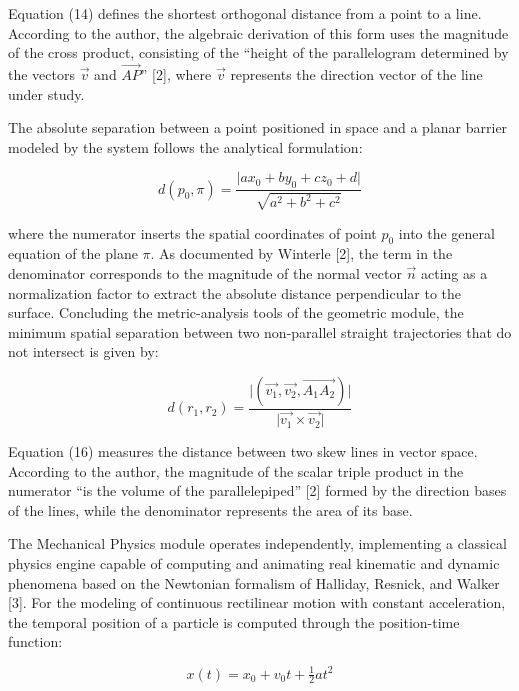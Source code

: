 \documentclass[conference,a4paper]{IEEEtran}
\begin{document}
Equation (14) defines the shortest orthogonal distance from a point to a line. According to the author, the algebraic derivation of this form uses the magnitude of the cross product, consisting of the ``height of the parallelogram determined by the vectors $\vec{v}$ and $\vec{AP}$'' [2], where $\vec{v}$ represents the direction vector of the line under study.

The absolute separation between a point positioned in space and a planar barrier modeled by the system follows the analytical formulation:

\begin{equation}
d(p_0,\pi) = \frac{\lvert a x_0 + b y_0 + c z_0 + d\rvert}{\sqrt{a^2+b^2+c^2}} \tag{15}
\end{equation}

where the numerator inserts the spatial coordinates of point $p_0$ into the general equation of the plane $\pi$. As documented by Winterle [2], the term in the denominator corresponds to the magnitude of the normal vector $\vec{n}$ acting as a normalization factor to extract the absolute distance perpendicular to the surface. Concluding the metric-analysis tools of the geometric module, the minimum spatial separation between two non-parallel straight trajectories that do not intersect is given by:

\begin{equation}
d(r_1,r_2) = \frac{\lvert(\vec{v_1},\vec{v_2},\vec{A_1A_2})\rvert}{\lvert \vec{v_1}\times \vec{v_2}\rvert} \tag{16}
\end{equation}

Equation (16) measures the distance between two skew lines in vector space. According to the author, the magnitude of the scalar triple product in the numerator ``is the volume of the parallelepiped'' [2] formed by the direction bases of the lines, while the denominator represents the area of its base.

The Mechanical Physics module operates independently, implementing a classical physics engine capable of computing and animating real kinematic and dynamic phenomena based on the Newtonian formalism of Halliday, Resnick, and Walker [3]. For the modeling of continuous rectilinear motion with constant acceleration, the temporal position of a particle is computed through the position-time function:

\begin{equation}
x(t) = x_0 + v_0 t + \tfrac{1}{2}a t^2 \tag{17}
\end{equation}
\end{document}
